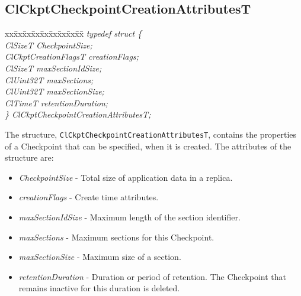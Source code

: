 \begin{flushleft}
\subsection{ClCkptCheckpointCreationAttributesT}
\begin{tabbing}
xx\=xx\=xx\=xx\=xx\=xx\=xx\=xx\=xx\=\kill
\textit{typedef struct \{}\\
\>\>\>\>\textit{ClSizeT CheckpointSize;}\\
\>\>\>\>\textit{ClCkptCreationFlagsT creationFlags;}\\
\>\>\>\>\textit{ClSizeT maxSectionIdSize;}\\
\>\>\>\>\textit{ClUint32T maxSections;}\\
\>\>\>\>\textit{ClUint32T maxSectionSize;}\\
\>\>\>\>\textit{ClTimeT retentionDuration;}\\
\textit{\} ClCkptCheckpointCreationAttributesT;}\end{tabbing}
The structure, {\tt{ClCkptCheckpointCreationAttributesT}}, contains the properties of a Checkpoint that can be specified, when it is created.
The attributes of the structure are:
\begin{itemize}
\item
\textit{CheckpointSize} - Total size of application data in a replica.
\item
\textit{creationFlags} - Create time attributes.
\item
\textit{maxSectionIdSize} - Maximum length of the section identifier.
\item
\textit{maxSections} - Maximum sections for this Checkpoint.
\item
\textit{maxSectionSize} - Maximum size of a section.
\item
\textit{retentionDuration} - Duration or period of retention. The Checkpoint that remains inactive for this
duration is deleted.
\end{itemize}




\end{flushleft}
